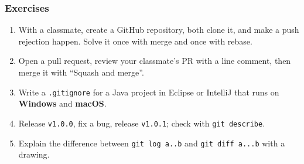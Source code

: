 \documentclass[aspectratio=169,10pt,compress]{beamer}
\newcommand{\win}{\textbf{Windows}}
\newcommand{\mac}{\textbf{macOS}}
\begin{document}
\begin{frame}[t,fragile] \frametitle{Exercises}
  \begin{enumerate}\small
    \item With a classmate, create a GitHub repository, both clone it, and make a push rejection happen. Solve it once with merge and once with rebase.
    \item Open a pull request, review your classmate's PR with a line comment, then merge it with ``Squash and merge''.
    \item Write a \texttt{.gitignore} for a Java project in Eclipse or IntelliJ that runs on \win{} and \mac.
    \item Release \texttt{v1.0.0}, fix a bug, release \texttt{v1.0.1}; check with \texttt{git describe}.
    \item Explain the difference between \texttt{git log a..b} and \texttt{git diff a...b} with a drawing.
  \end{enumerate}
\end{frame}




\begin{frame}[t,fragile]
	\begin{center}
		\vspace{4cm}
	\end{center}
\end{frame}
\end{document}

